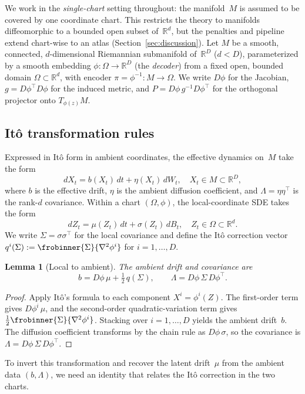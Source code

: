 \documentclass[11pt]{article}
\newcommand{\R}{\mathbb{R}}
\newcommand{\Om}{\Omega}
\newtheorem{lem}[thm]{Lemma}
\begin{document}
We work in the \emph{single-chart} setting throughout:
the manifold~$M$ is assumed to be covered by one
coordinate chart.
This restricts the theory to manifolds diffeomorphic to
a bounded open subset of~$\R^d$, but the penalties and
pipeline extend chart-wise to an atlas
(Section~\ref{sec:discussion}).
Let $M$ be a smooth, connected, $d$-dimensional Riemannian
submanifold of~$\R^D$ ($d<D$), parameterized by a smooth embedding
$\phi:\Om\to\R^D$ (the \emph{decoder}) from a fixed open,
bounded domain $\Om\subset\R^d$, with encoder
$\pi=\phi^{-1}:M\to \Om$.
We write $D\phi$ for the Jacobian,
$g=D\phi^\top D\phi$ for the induced metric, and
$P=D\phi\,g^{-1}D\phi^\top$ for the orthogonal projector onto
$T_{\phi(z)}M$.

\subsection{It\^o transformation rules}\label{ssec:background}

Expressed in It\^o form in ambient coordinates, the effective dynamics
on~$M$ take the form
$$dX_t = b(X_t)\,dt + \eta(X_t)\,dW_t, \quad X_t\in M\subset\R^D,$$
where $b$ is the effective drift, $\eta$ is the ambient diffusion
coefficient, and $\Lambda=\eta\eta^\top$ is the rank-$d$
covariance.
Within a chart $(\Om,\phi)$, the local-coordinate SDE takes the form
$$dZ_t = \mu(Z_t)\,dt + \sigma(Z_t)\,dB_t, \quad Z_t\in \Om\subset\R^d.$$
We write $\Sigma=\sigma\sigma^\top$ for the local covariance and
define the It\^o correction vector
$q^i(\Sigma) := \frobinner{\Sigma}{\nabla^2\phi^i}$ for
$i=1,\dots,D$.

\begin{lem}[Local to ambient]\label{lem:local-to-ambient}
  The ambient drift and covariance are
  \[
    b = D\phi\,\mu + \tfrac{1}{2}\,q(\Sigma),
    \qquad
    \Lambda = D\phi\,\Sigma\,D\phi^\top.
  \]
\end{lem}

\begin{proof}
  Apply It\^o's formula to each component $X^i = \phi^i(Z)$.
  The first-order term gives $D\phi^i\,\mu$, and the second-order
  quadratic-variation term gives
  $\frac{1}{2}\frobinner{\Sigma}{\nabla^2\phi^i}$.
  Stacking over $i=1,\dots,D$ yields the ambient drift~$b$.
  The diffusion coefficient transforms by the chain rule as
  $D\phi\,\sigma$, so the covariance is
  $\Lambda = D\phi\,\Sigma\,D\phi^\top$.
\end{proof}

To invert this transformation and recover the latent drift~$\mu$ from
the ambient data $(b,\Lambda)$, we need an identity that relates the
It\^o correction in the two charts.
\end{document}
